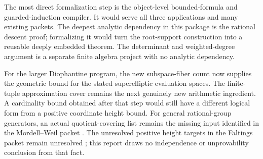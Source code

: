The most direct formalization step is the object-level bounded-formula
and guarded-induction compiler. It would serve all three applications
and many existing packets. The deepest analytic dependency in this
package is the rational descent proof; formalizing it would turn the
root-support construction into a reusable deeply embedded theorem.
The determinant and weighted-degree argument is a separate finite
algebra project with no analytic dependency.

For the larger Diophantine program, the new subspace-fiber count now
supplies the geometric bound for the stated superelliptic evaluation
spaces. The finite-tuple approximation cover remains the next genuinely
new arithmetic ingredient. A cardinality bound obtained after that step
would still have a different logical form from a positive coordinate
height bound. For general rational-group generators, an actual
quotient-covering list remains the missing input identified in the
Mordell--Weil packet \cite{repo-mordell}. The unresolved positive
height targets in the Faltings packet remain unresolved
\cite{repo-faltings}; this report draws no independence or unprovability
conclusion from that fact.
